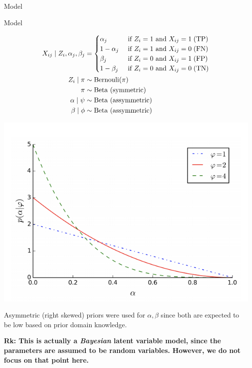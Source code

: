 \documentclass[10pt]{beamer}
\begin{document}
\begin{frame}{Model}
\begin{sblock}{Model}
\begin{minipage}{.65\textwidth}
\begin{align*}
X_{ij} \; | \; Z_{i}, \alpha_j, \beta_j &= 
\begin{cases}
\alpha_j&  \text{ if } Z_i  =1   \text{ and }  X_{ij} = 1  \;  \text{(TP)} \\
1 - \alpha_j&  \text{ if }  Z_i  =1    \text{ and } X_{ij} = 0     \; \text{(FN)} \\
\beta_j &  \text{ if }  Z_i  =0  \text{ and } X_{ij} = 1     \; \text{(FP)} \\
1 - \beta_j& \text{ if } Z_i  =0  \text{ and } X_{ij} = 0    \;  \text{(TN)} \\
\end{cases} \\
Z_i \; | \; \pi & \sim \text{Bernouli}(\pi) \\
\pi &\sim \text{Beta (symmetric)} \\
\alpha \; | \; \psi &\sim \text{Beta (assymmetric)} \\
\beta \; | \; \phi &\sim \text{Beta (assymmetric)} \\
\end{align*}
\end{minipage}
\hfill 
\begin{minipage}{.3\textwidth}
\begin{center}
\includegraphics[width=\textwidth]{images/assymmetric_beta_kantchelian}

\scriptsize Asymmetric (right skewed) priors were used for $\alpha, \beta$ since both are expected to be low based on prior domain knowledge. 
\end{center}

\end{minipage}

\end{sblock}

\vfill \vfill \vfill \bf{Rk:} This is actually a \textit{Bayesian} latent variable model, since the parameters are assumed to be random variables.  However, we do not focus on that point here.
\end{frame}
\end{document}
